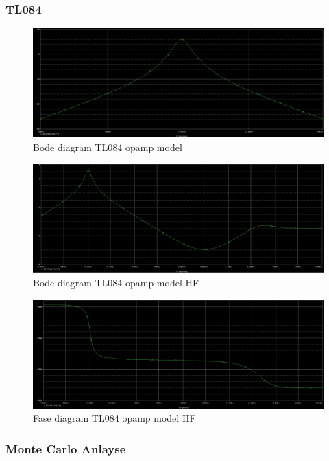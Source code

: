 \documentclass[]{article}
\begin{document}
\newpage

\subsubsection*{TL084}

\begin{figure}[H]
	\centering
	\includegraphics[width=13cm]{bode_TL084_smal}
	\caption{Bode diagram TL084 opamp model}
\end{figure}

\begin{figure}[H]
	\centering
	\includegraphics[width=13cm]{bode_TL084}
	\caption{Bode diagram TL084 opamp model HF}
\end{figure}

\begin{figure}[H]
	\centering
	\includegraphics[width=13cm]{fase_TL084}
	\caption{Fase diagram TL084 opamp model HF}
\end{figure}

\newpage

\subsubsection*{Monte Carlo Anlayse}
\end{document}
